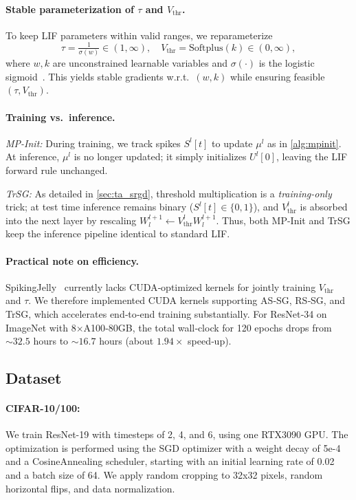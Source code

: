\paragraph{Stable parameterization of \(\tau\) and \(V_{\text{thr}}\).}
To keep LIF parameters within valid ranges, we reparameterize
\[
\tau = \tfrac{1}{\sigma(w)} \in (1,\infty), \quad 
V_{\text{thr}} = \mathrm{Softplus}(k) \in (0,\infty),
\]
where \(w,k\) are unconstrained learnable variables and \(\sigma(\cdot)\) is the logistic sigmoid~\cite{fang:2021}. This yields stable gradients w.r.t.\ \((w,k)\) while ensuring feasible \((\tau,V_{\text{thr}})\).

\paragraph{Training vs.\ inference.}

\emph{MP-Init:} During training, we track spikes $S^{l}[t]$ to update $\mu^{l}$ as in \cref{alg:mpinit}. At inference, $\mu^{l}$ is no longer updated; it simply initializes $U^{l}[0]$, leaving the LIF forward rule unchanged.  

\emph{TrSG:} As detailed in \cref{sec:ta_srgd}, threshold multiplication is a \emph{training-only} trick; at test time inference remains binary ($S^{l}[t]\!\in\!\{0,1\}$), and $V_{\text{thr}}^{l}$ is absorbed into the next layer by rescaling $W^{l+1}_{l}\!\leftarrow\! V_{\text{thr}}^{l} W^{l+1}_{l}$. Thus, both MP-Init and TrSG keep the inference pipeline identical to standard LIF.


\paragraph{Practical note on efficiency.}
SpikingJelly~\cite{spikingjelly} currently lacks CUDA‑optimized kernels for jointly training \(V_{\text{thr}}\) and \(\tau\). We therefore implemented CUDA kernels supporting AS‑SG, RS‑SG, and TrSG, which accelerates end‑to‑end training substantially. For ResNet‑34 on ImageNet with 8$\times$A100‑80GB, the total wall‑clock for 120 epochs drops from \(\sim 32.5\) hours to \(\sim 16.7\) hours (about \(1.94\times\) speed‑up).


\subsection{Dataset}
\label{subsec:dataset}

\paragraph{CIFAR-10/100:} We train ResNet-19 with timesteps of 2, 4, and 6, using one RTX3090 GPU. The optimization is performed using the SGD optimizer with a weight decay of 5e-4 and a CosineAnnealing scheduler, starting with an initial learning rate of 0.02 and a batch size of 64. We apply random cropping to 32x32 pixels, random horizontal flips, and data normalization.

